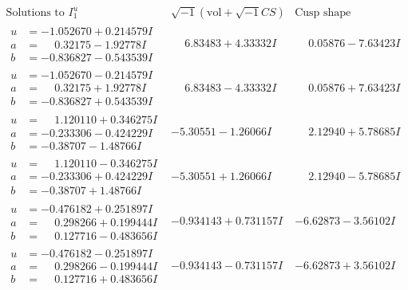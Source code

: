\documentclass[1p]{elsarticle_modified}
\theoremstyle{definition}
\newcommand{\I}{\sqrt{-1}}
\begin{document}
$$\begin{array}{c|c|c}  
\text{Solutions to }I^u_{1}& \I (\text{vol} + \sqrt{-1}CS) & \text{Cusp shape}\\
 \hline 
\begin{aligned}
u &= -1.052670 + 0.214579 I \\
a &= \phantom{-}0.32175 - 1.92778 I \\
b &= -0.836827 - 0.543539 I\end{aligned}
 & \phantom{-}6.83483 + 4.33332 I & \phantom{-}0.05876 - 7.63423 I \\ \hline\begin{aligned}
u &= -1.052670 - 0.214579 I \\
a &= \phantom{-}0.32175 + 1.92778 I \\
b &= -0.836827 + 0.543539 I\end{aligned}
 & \phantom{-}6.83483 - 4.33332 I & \phantom{-}0.05876 + 7.63423 I \\ \hline\begin{aligned}
u &= \phantom{-}1.120110 + 0.346275 I \\
a &= -0.233306 - 0.424229 I \\
b &= -0.38707 - 1.48766 I\end{aligned}
 & -5.30551 - 1.26066 I & \phantom{-}2.12940 + 5.78685 I \\ \hline\begin{aligned}
u &= \phantom{-}1.120110 - 0.346275 I \\
a &= -0.233306 + 0.424229 I \\
b &= -0.38707 + 1.48766 I\end{aligned}
 & -5.30551 + 1.26066 I & \phantom{-}2.12940 - 5.78685 I \\ \hline\begin{aligned}
u &= -0.476182 + 0.251897 I \\
a &= \phantom{-}0.298266 + 0.199444 I \\
b &= \phantom{-}0.127716 - 0.483656 I\end{aligned}
 & -0.934143 + 0.731157 I & -6.62873 - 3.56102 I \\ \hline\begin{aligned}
u &= -0.476182 - 0.251897 I \\
a &= \phantom{-}0.298266 - 0.199444 I \\
b &= \phantom{-}0.127716 + 0.483656 I\end{aligned}
 & -0.934143 - 0.731157 I & -6.62873 + 3.56102 I \\ \hline\begin{aligned}

\end{aligned}
\end{array}$$
\end{document}
